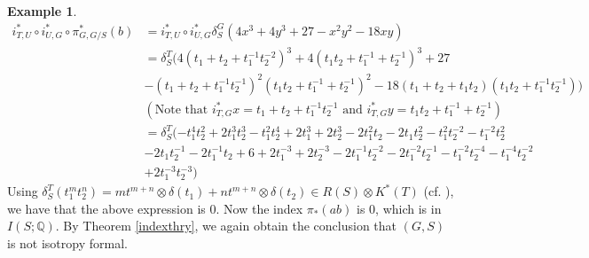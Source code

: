 \documentclass[11pt]{amsart}
\theoremstyle{plain}
\theoremstyle{definition}
\newtheorem{example}[theorem]{Example}
\begin{document}
\begin{example}
	\begin{align*}
		i_{T, U}^*\circ i_{U, G}^*\circ \pi_{G, G/S}^*(b)&=i_{T, U}^*\circ i_{U, G}^*\delta_S^G(4x^3+4y^3+27-x^2y^2-18xy)\\
		&=\delta_S^T(4(t_1+t_2+t_1^{-1}t_2^{-2})^3+4(t_1t_2+t_1^{-1}+t_2^{-1})^3+27\\
		&-(t_1+t_2+t_1^{-1}t_2^{-1})^2(t_1t_2+t_1^{-1}+t_2^{-1})^2-18(t_1+t_2+t_1t_2)(t_1t_2+t_1^{-1}t_2^{-1}))\\
		&(\text{Note that }i_{T, G}^*x=t_1+t_2+t_1^{-1}t_2^{-1}\text{ and }i_{T, G}^*y=t_1t_2+t_1^{-1}+t_2^{-1})\\
		&=\delta_S^T(-t_1^4t_2^2+2t_1^3t_2^3-t_1^2t_2^4+2t_1^3+2t_2^3-2t_1^2t_2-2t_1t_2^2-t_1^2t_2^{-2}-t_1^{-2}t_2^2\\
		&-2t_1t_2^{-1}-2t_1^{-1}t_2+6+2t_1^{-3}+2t_2^{-3}-2t_1^{-1}t_2^{-2}-2t_1^{-2}t_2^{-1}-t_1^{-2}t_2^{-4}-t_1^{-4}t_2^{-2}\\
		&+2t_1^{-3}t_2^{-3})
	\end{align*}
	Using $\delta_S^T(t_1^mt_2^n)=mt^{m+n}\otimes\delta(t_1)+nt^{m+n}\otimes\delta(t_2)\in R(S)\otimes K^*(T)$ (cf. \cite[Lemma 4.19]{F}), we have that the above expression is 0. Now the index $\pi_*(ab)$ is 0, which is in $I(S; \mathbb{Q})$. By Theorem \ref{indexthry}, we again obtain the conclusion that $(G, S)$ is not isotropy formal.
\end{example}
\end{document}
